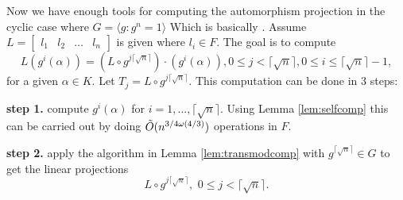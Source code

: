 Now we have enough tools for computing the automorphism projection in the cyclic case where $G = \langle g: g^n =1 \rangle$
Which is basically \cite[Algorithm AP]{Kaltofen}. 
Assume $L = \begin{bmatrix}
l_1 & l_2 & \ldots & l_n
\end{bmatrix}$ is given where $l_i \in F$. The goal is to compute 
\begin{equation}\label{eq:autproj}
L(g^i(\alpha)) = (L \circ g^{j \lceil \sqrt{n} \rceil})\cdot (g^i(\alpha)), 0 \leq j < \lceil \sqrt{n} \rceil, 0 \leq i \leq \lceil \sqrt{n} \rceil -1, 
\end{equation}
for a given $\alpha \in K$. 
Let $T_j = L\circ g^{j \lceil \sqrt{n} \rceil}$.
This computation can be done in 3 steps:

\textbf{step 1.} compute $g^i(\alpha)$ for $i = 1, \ldots , \lceil \sqrt{n} \rceil$. Using Lemma \ref{lem:selfcomp} this 
can be carried out by doing $\tilde{O}(n^{3/4 \omega(4/3)})$ operations in $F$.

\textbf{step 2.} apply the algorithm in Lemma \ref{lem:transmodcomp} with $g^ {\lceil \sqrt{n} \rceil} \in G$ to get the linear projections 
$$L \circ g^{j \lceil \sqrt{n} \rceil}, \,\, 0 \leq j < \lceil \sqrt{n} \rceil.$$ 

